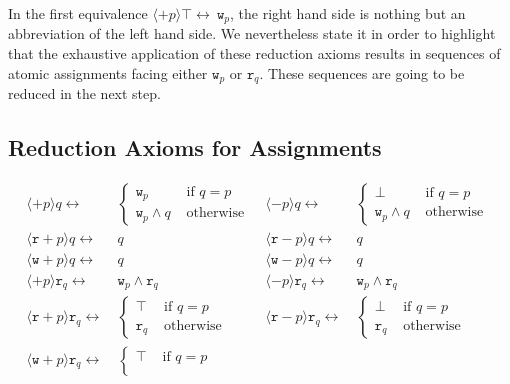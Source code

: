 \documentclass{llncs}
\newcommand{\readable}[1]{\mathtt{r}_{#1}}
\newcommand{\writable}[1]{\mathtt{w}_{#1}}
\newcommand{\assgntopR}[1]{{\mathtt r {+} #1}}
\newcommand{\assgnbotR}[1]{{\mathtt r {-} #1}}
\newcommand{\assgntopW}[1]{{\mathtt w {+} #1}}
\newcommand{\assgnbotW}[1]{{\mathtt w {-} #1}}
\newcommand{\assgntopV}[1]{{\mathtt {+} #1}}
\newcommand{\assgnbotV}[1]{{\mathtt {-} #1}}
\newcommand{\ldia}[1]{ \big\langle #1 \big\rangle}
\newcommand{\leqv}{ \leftrightarrow }
\begin{document}
In the first equivalence $\ldia{\assgntopV p} \top \leqv \  \writable p$, 
the right hand side is nothing but an abbreviation of the left hand side. 
We nevertheless state it in order to highlight that the exhaustive application of these reduction axioms 
results in sequences of atomic assignments facing 
either $\writable p$ or $\readable q$. 
These sequences are going to be reduced in the next step. 


\subsection{Reduction Axioms for Assignments}\label{sec:redax_atmpgm} 

\begin{table}[t]
\begin{align*}
\ldia{\assgntopV p } q \leqv &\ \begin{cases} 
					\writable{p} 	& \text{ if } q = p \\
					\writable{p} \land q & \text{ otherwise } 
					\end{cases} 
& \ldia{\assgnbotV p } q \leqv &\ \begin{cases} 
					\bot 	& \text{ if } q = p \\
					\writable{p} \land q & \text{ otherwise } 
					\end{cases} 
\\
\ldia{\assgntopR p } q \leqv &\ q
& \ldia{\assgnbotR p } q \leqv &\ q
\\
\ldia{\assgntopW p } q \leqv &\ q
& \ldia{\assgnbotW p } q \leqv &\ q
%
\\
\ldia{\assgntopV p} \readable q \leqv &\  \writable p \land \readable q
& \ldia{\assgnbotV p} \readable q \leqv &\  \writable p \land \readable q
\\
\ldia{\assgntopR p} \readable q \leqv &\ \begin{cases}
								\top & \text{ if } q = p \\
								\readable q & \text{ otherwise }
								\end{cases}
& \ldia{\assgnbotR p} \readable q \leqv &\ \begin{cases}
								\bot & \text{ if } q = p \\
								\readable q & \text{ otherwise }
								\end{cases}
\\
\ldia{\assgntopW p} \readable q \leqv &\ \begin{cases}
                \top & \text{ if } q = p \\

\end{cases}
\end{align*}
\end{table}
\end{document}
